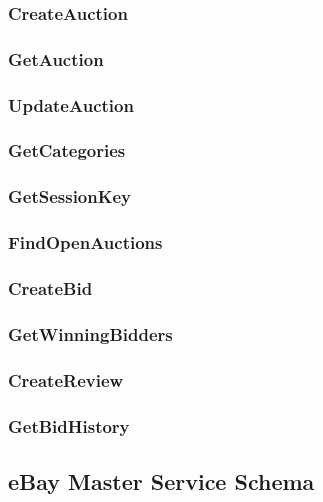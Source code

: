 \documentclass[12pt,a4paper]{article}
\begin{document}
\subsubsection{CreateAuction}
\subsubsection{GetAuction}
\subsubsection{UpdateAuction}
\subsubsection{GetCategories}
\subsubsection{GetSessionKey}
\subsubsection{FindOpenAuctions}
\subsubsection{CreateBid}
\subsubsection{GetWinningBidders}
\subsubsection{CreateReview}
\subsubsection{GetBidHistory}


\subsection{eBay Master Service Schema}
\end{document}
